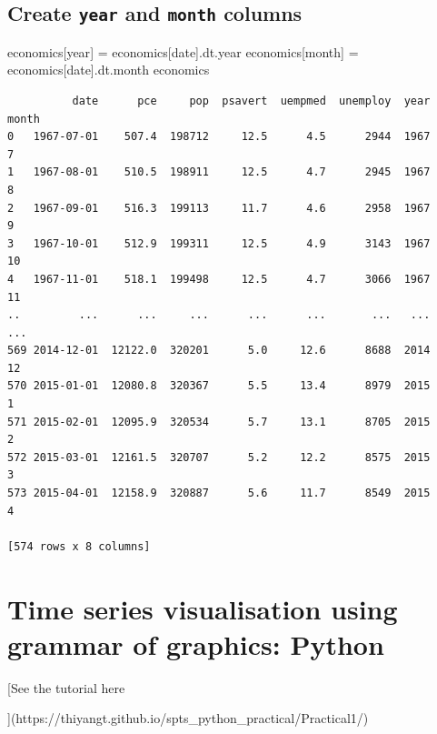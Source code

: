 \documentclass[
  11pt,
  a4paper,
]{report}
\newenvironment{Shaded}{\begin{snugshade}}{\end{snugshade}}
\newcommand{\NormalTok}[1]{\textcolor[rgb]{0.00,0.23,0.31}{#1}}
\newcommand{\OperatorTok}[1]{\textcolor[rgb]{0.37,0.37,0.37}{#1}}
\newcommand{\StringTok}[1]{\textcolor[rgb]{0.13,0.47,0.30}{#1}}
\begin{document}
\subsection{\texorpdfstring{Create \texttt{year} and \texttt{month}
columns}{Create year and month columns}}\label{create-year-and-month-columns}

\begin{Shaded}
\begin{Highlighting}[]
\NormalTok{economics[}\StringTok{\textquotesingle{}year\textquotesingle{}}\NormalTok{] }\OperatorTok{=}\NormalTok{ economics[}\StringTok{\textquotesingle{}date\textquotesingle{}}\NormalTok{].dt.year}
\NormalTok{economics[}\StringTok{\textquotesingle{}month\textquotesingle{}}\NormalTok{] }\OperatorTok{=}\NormalTok{ economics[}\StringTok{\textquotesingle{}date\textquotesingle{}}\NormalTok{].dt.month}
\NormalTok{economics}
\end{Highlighting}
\end{Shaded}

\begin{verbatim}
          date      pce     pop  psavert  uempmed  unemploy  year  month
0   1967-07-01    507.4  198712     12.5      4.5      2944  1967      7
1   1967-08-01    510.5  198911     12.5      4.7      2945  1967      8
2   1967-09-01    516.3  199113     11.7      4.6      2958  1967      9
3   1967-10-01    512.9  199311     12.5      4.9      3143  1967     10
4   1967-11-01    518.1  199498     12.5      4.7      3066  1967     11
..         ...      ...     ...      ...      ...       ...   ...    ...
569 2014-12-01  12122.0  320201      5.0     12.6      8688  2014     12
570 2015-01-01  12080.8  320367      5.5     13.4      8979  2015      1
571 2015-02-01  12095.9  320534      5.7     13.1      8705  2015      2
572 2015-03-01  12161.5  320707      5.2     12.2      8575  2015      3
573 2015-04-01  12158.9  320887      5.6     11.7      8549  2015      4

[574 rows x 8 columns]
\end{verbatim}

\section{Time series visualisation using grammar of graphics:
Python}\label{time-series-visualisation-using-grammar-of-graphics-python}

{[}See the tutorial here

{]}(https://thiyangt.github.io/spts\_python\_practical/Practical1/)
\end{document}
